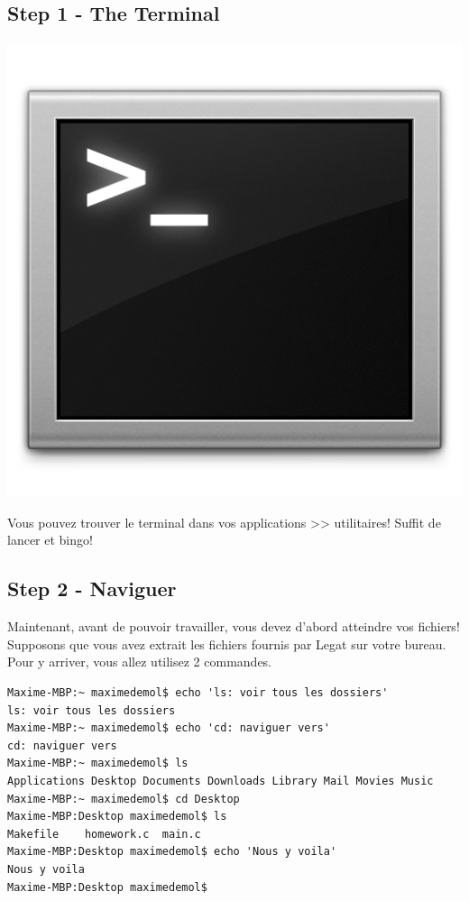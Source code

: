 \documentclass[11pt,a4paper]{article}
\begin{document}
\subsection{Step 1 - The Terminal}
\begin{minipage}[c]{.20\linewidth}
\includegraphics[width=\linewidth]{terminal.png}
\end{minipage} \hfill
\begin{minipage}[c]{.74\linewidth}
Vous pouvez trouver le terminal dans vos applications >> utilitaires! Suffit de lancer et bingo!
\end{minipage}

\subsection{Step 2 - Naviguer}

Maintenant, avant de pouvoir travailler, vous devez d'abord atteindre vos fichiers! Supposons que vous avez extrait les fichiers fournis par Legat sur votre bureau. Pour y arriver, vous allez utilisez 2 commandes.

\begin{lstlisting}[style=Bash]
Maxime-MBP:~ maximedemol$ echo 'ls: voir tous les dossiers'
ls: voir tous les dossiers
Maxime-MBP:~ maximedemol$ echo 'cd: naviguer vers'
cd: naviguer vers
Maxime-MBP:~ maximedemol$ ls
Applications Desktop Documents Downloads Library Mail Movies Music
Maxime-MBP:~ maximedemol$ cd Desktop
Maxime-MBP:Desktop maximedemol$ ls
Makefile	homework.c	main.c
Maxime-MBP:Desktop maximedemol$ echo 'Nous y voila'
Nous y voila
Maxime-MBP:Desktop maximedemol$ 
\end{lstlisting}
\vspace{12pt}
\end{document}
